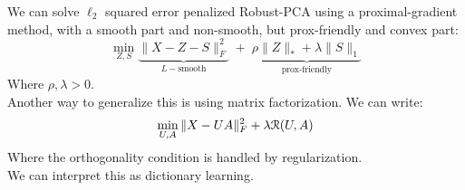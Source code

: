 \documentclass[12pt]{article}
\begin{document}
We can solve $\ell_2$ squared error penalized
Robust-PCA using a proximal-gradient method, 
with a smooth part and non-smooth, but prox-friendly
and convex part:
\[ \min_{Z, S} 
\underbrace{\| X - Z - S \|^2_F}_{L-\text{smooth}} \; + \; 
\underbrace{\rho \|Z\|_* 
+ \lambda \|S\|_1}_{\text{prox-friendly}} \]
Where $\rho, \lambda > 0$. \\ 

Another way to generalize this is using matrix 
factorization. We can write:
\[ \min_{U, A} \| X - UA \|_F^2 + \lambda \mathcal{R}(U, A) \]
Where the orthogonality condition is handled by 
regularization. \\

We can interpret this as dictionary learning. \\

\newpage
\end{document}
